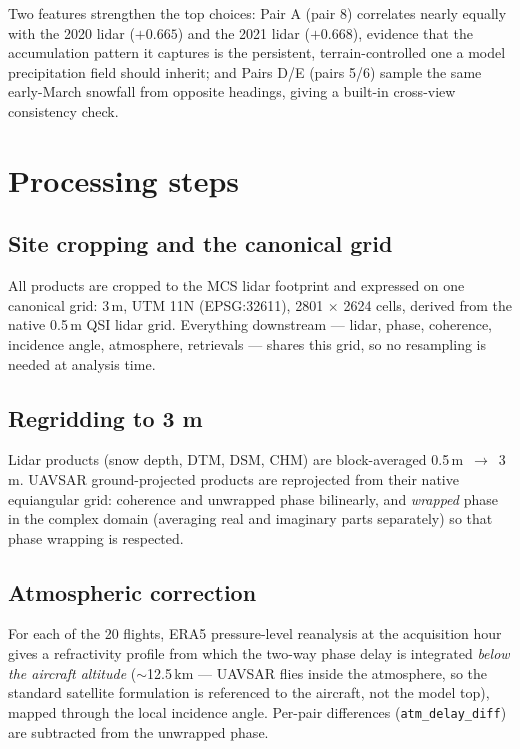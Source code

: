 \documentclass[11pt]{article}
\begin{document}
\begin{table}[h]
\centering
\caption{Top 5 pairs for precipitation-pattern input, plus the zero-change example.
$r$ vs lidar is the polarization-mean correlation with the season-matched QSI snow
depth at 90\,m; cross-pol is the mean inter-polarization correlation of the retrieval.}
\label{tab:top}
\medskip
\resizebox{\textwidth}{!}{}
\end{table}

Two features strengthen the top choices: Pair A (pair 8) correlates nearly equally with
the 2020 lidar ($+0.665$) and the 2021 lidar ($+0.668$), evidence that the accumulation
pattern it captures is the persistent, terrain-controlled one a model precipitation field
should inherit; and Pairs D/E (pairs 5/6) sample the same early-March snowfall from
opposite headings, giving a built-in cross-view consistency check.

\section{Processing steps}

\subsection{Site cropping and the canonical grid}
All products are cropped to the MCS lidar footprint and expressed on one canonical grid:
3\,m, UTM 11N (EPSG:32611), 2801 $\times$ 2624 cells, derived from the native 0.5\,m QSI
lidar grid. Everything downstream --- lidar, phase, coherence, incidence angle,
atmosphere, retrievals --- shares this grid, so no resampling is needed at analysis time.

\subsection{Regridding to 3 m}
Lidar products (snow depth, DTM, DSM, CHM) are block-averaged 0.5\,m~$\to$~3\,m. UAVSAR
ground-projected products are reprojected from their native equiangular grid: coherence
and unwrapped phase bilinearly, and \emph{wrapped} phase in the complex domain (averaging
real and imaginary parts separately) so that phase wrapping is respected.

\subsection{Atmospheric correction}
For each of the 20 flights, ERA5 pressure-level reanalysis at the acquisition hour gives
a refractivity profile from which the two-way phase delay is integrated \emph{below the
aircraft altitude} ($\sim$12.5\,km --- UAVSAR flies inside the atmosphere, so the
standard satellite formulation is referenced to the aircraft, not the model top), mapped
through the local incidence angle. Per-pair differences (\texttt{atm\_delay\_diff}) are
subtracted from the unwrapped phase.
\end{document}
